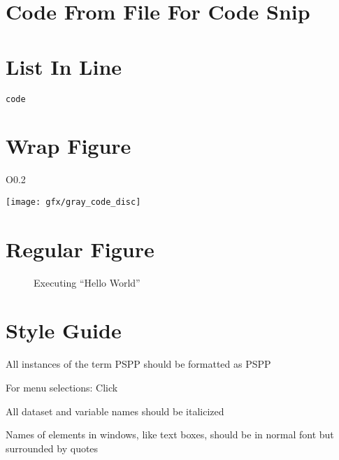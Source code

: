 \section{Code From File For Code Snip}


\section{List In Line}
\lstinline[columns=fixed]|code|

\section{Wrap Figure}
\begin{wrapfigure}{O}{0.2\textwidth}
	\caption{} %
	\label{BM:fig:gray_code_disc} 
	\centering
	\texttt{[image: gfx/gray\_code\_disc]} 
\end{wrapfigure}


\section{Regular Figure}
\begin{figure}[H]
  \centering
  \caption{Executing ``Hello World''}
  \label{lab01:fig:executing_hello_world}
\end{figure}

\section{Style Guide}
All instances of the term PSPP should be formatted as \acs{PSPP}

For menu selections:
Click \textsc{}

All dataset and variable names should be italicized

Names of elements in windows, like text boxes, should be in normal font but surrounded by quotes